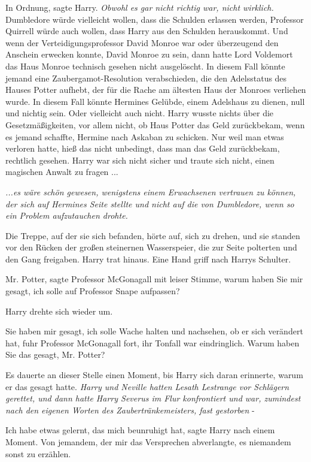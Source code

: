\glqq{}In Ordnung\grqq{}, sagte Harry. \emph{Obwohl es gar nicht richtig war,
nicht wirklich.} Dumbledore würde vielleicht wollen, dass die Schulden erlassen
werden, Professor Quirrell würde auch wollen, dass Harry aus den Schulden
herauskommt. Und wenn der Verteidigungsprofessor David Monroe war oder
überzeugend den Anschein erwecken konnte, David Monroe zu sein, dann hatte Lord
Voldemort das Haus Monroe technisch gesehen nicht ausgelöscht. In diesem Fall
könnte jemand eine Zaubergamot-Resolution verabschieden, die den Adelsstatus des
Hauses Potter aufhebt, der für die Rache am ältesten Haus der Monroes verliehen
wurde. In diesem Fall könnte Hermines Gelübde, einem Adelshaus zu dienen, null
und nichtig sein. Oder vielleicht auch nicht. Harry wusste nichts über die
Gesetzmäßigkeiten, vor allem nicht, ob Haus Potter das Geld zurückbekam, wenn es
jemand schaffte, Hermine nach Askaban zu schicken. Nur weil man etwas verloren
hatte, hieß das nicht unbedingt, dass man das Geld zurückbekam, rechtlich
gesehen. Harry war sich nicht sicher und traute sich nicht, einen magischen
Anwalt zu fragen ...

\emph{...es wäre schön gewesen, wenigstens einem Erwachsenen vertrauen zu
können, der sich auf Hermines Seite stellte und nicht auf die von Dumbledore,
wenn so ein Problem aufzutauchen drohte.}

Die Treppe, auf der sie sich befanden, hörte auf, sich zu drehen, und sie
standen vor den Rücken der großen steinernen Wasserspeier, die zur Seite
polterten und den Gang freigaben. Harry trat hinaus. Eine Hand griff nach Harrys
Schulter.

\glqq{}Mr. Potter\grqq{}, sagte Professor McGonagall mit leiser Stimme, \glqq{}
warum haben Sie mir gesagt, ich solle auf Professor Snape aufpassen?\grqq{}

Harry drehte sich wieder um.

\glqq{}Sie haben mir gesagt, ich solle Wache halten und nachsehen, ob er sich
verändert hat\grqq{}, fuhr Professor McGonagall fort, ihr Tonfall war
eindringlich. \glqq{}Warum haben Sie das gesagt, Mr. Potter?\grqq{}

Es dauerte an dieser Stelle einen Moment, bis Harry sich daran erinnerte, warum
er das gesagt hatte. \emph{Harry und Neville hatten Lesath Lestrange vor
Schlägern gerettet, und dann hatte Harry Severus im Flur konfrontiert und war,
zumindest nach den eigenen Worten des Zaubertränkemeisters, \glqq{}fast
gestorben\grqq{}} -

\glqq{}Ich habe etwas gelernt, das mich beunruhigt hat\grqq{}, sagte Harry nach
einem Moment. \glqq{}Von jemandem, der mir das Versprechen abverlangte, es
niemandem sonst zu erzählen.\grqq{}

